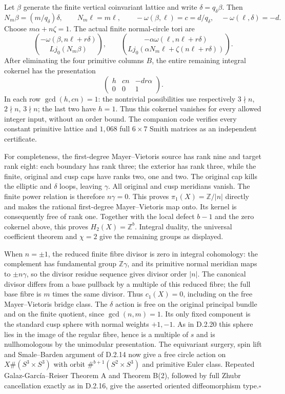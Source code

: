 Let $\beta$ generate the finite vertical coinvariant lattice and write
$\delta=q_\delta\beta$. Then
\[
 N_m\beta=(m/q_\delta)\delta,\qquad N_m\ell=m\ell,
 \qquad -\omega(\beta,\ell)=c=d/q_\delta,\quad
 -\omega(\ell,\delta)=-d.
\]
Choose $m\alpha+n\zeta=1$. The actual finite normal-circle tori are
\[
 \binom{-\omega(\beta,n\ell+r\delta)}{Lj_0(N_m\beta)},\qquad
 \binom{-\alpha\omega(\ell,n\ell+r\delta)}
 {Lj_0(\alpha N_m\ell+\zeta(n\ell+r\delta))}.
\]
After eliminating the four primitive columns $B$, the entire remaining
integral cokernel has the presentation
\[
                 \begin{pmatrix}h&cn&-dr\alpha\\0&0&1\end{pmatrix}.
\]
In each row $\gcd(h,cn)=1$: the nontrivial possibilities use respectively
$3\nmid n$, $2\nmid n$, $3\nmid n$; the last two have $h=1$.
Thus this cokernel vanishes for every allowed integer input, without an
order bound. The companion code verifies every constant primitive lattice
and $1,068$ full $6\times7$ Smith matrices as an independent certificate.

For completeness, the first-degree Mayer--Vietoris source has rank nine
and target rank eight: each boundary has rank three; the exterior has
rank three, while the finite, original and cusp caps have ranks two,
one and two. The original cap kills the elliptic and $\delta$ loops,
leaving $\gamma$. All original and cusp meridians vanish. The finite
power relation is therefore $n\gamma=0$. This proves
$\pi_1(X)=\mathbb Z/|n|$ directly and makes the rational first-degree
Mayer--Vietoris map onto. Its kernel is consequently free of rank one.
Together with the local defect $b-1$ and the zero cokernel above, this
proves $H_2(X)=\mathbb Z^b$. Integral duality, the universal coefficient
theorem and $\chi=2$ give the remaining groups as displayed.

When $n=\pm1$, the reduced finite fibre divisor is zero in integral
cohomology: the complement has fundamental group $\mathbb Z\gamma$,
and its primitive normal meridian maps to $\pm n\gamma$, so the divisor
residue sequence gives divisor order $|n|$. The canonical divisor differs
from a base pullback by a multiple of this reduced fibre; the full base
fibre is $m$ times the same divisor. Thus $c_1(X)=0$, including on the free
Mayer--Vietoris bridge class. The $\delta$ action is free on the original
principal bundle and on the finite quotient, since $\gcd(n,m)=1$.
Its only fixed component is the standard cusp sphere with normal weights
$+1,-1$. As in D.2.20 this sphere lies in the image of the regular fibre,
hence is a multiple of $s$ and is nullhomologous by the unimodular
presentation. The equivariant surgery, spin lift and Smale--Barden
argument of D.2.14 now give a free circle action on
$X\#(S^3\times S^3)$ with orbit
$\#^{b+1}(S^2\times S^3)$ and primitive Euler class.
Repeated Galaz-Garc\'ia--Reiser Theorem A and Theorem B(2), followed by
full Zhubr cancellation exactly as in D.2.16, give the asserted oriented
diffeomorphism type.\hfill$\square$
